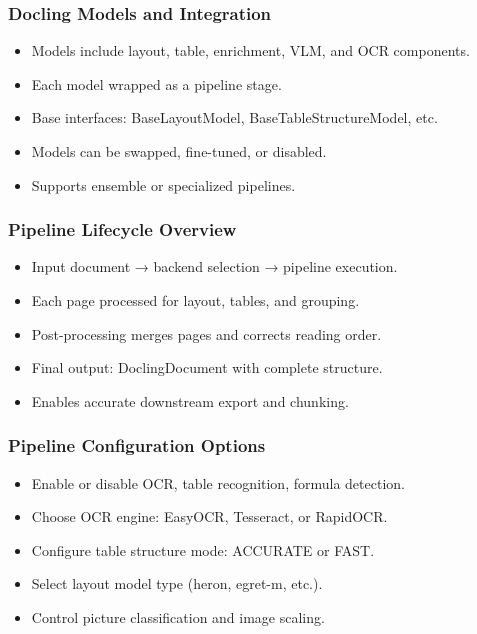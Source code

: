 \begin{frame}[fragile]\frametitle{Docling Models and Integration}
      \begin{itemize}
        \item Models include layout, table, enrichment, VLM, and OCR components.
        \item Each model wrapped as a pipeline stage.
        \item Base interfaces: BaseLayoutModel, BaseTableStructureModel, etc.
        \item Models can be swapped, fine-tuned, or disabled.
        \item Supports ensemble or specialized pipelines.
      \end{itemize}
\end{frame}

\begin{frame}[fragile]\frametitle{Pipeline Lifecycle Overview}
      \begin{itemize}
        \item Input document → backend selection → pipeline execution.
        \item Each page processed for layout, tables, and grouping.
        \item Post-processing merges pages and corrects reading order.
        \item Final output: DoclingDocument with complete structure.
        \item Enables accurate downstream export and chunking.
      \end{itemize}
\end{frame}

\begin{frame}[fragile]\frametitle{Pipeline Configuration Options}
      \begin{itemize}
        \item Enable or disable OCR, table recognition, formula detection.
        \item Choose OCR engine: EasyOCR, Tesseract, or RapidOCR.
        \item Configure table structure mode: ACCURATE or FAST.
        \item Select layout model type (heron, egret-m, etc.).
        \item Control picture classification and image scaling.
      \end{itemize}
\end{frame}

